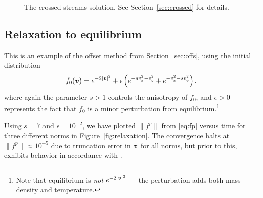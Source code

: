 \begin{figure}
    \centering
    \caption{The crossed streams solution. See Section~\vref{sec:crossed} for details.}
    \label{fig:hc1:sols}
\end{figure}

\subsection{Relaxation to equilibrium} \label{sec:relax}

This is an example of the offset method from Section~\ref{sec:offs}, using the initial distribution
\[
    f_0({\bm v}) = e^{-2|{\bm v}|^2} + \epsilon\left(e^{-sv_x^2-v_y^2} + 
            e^{-v_x^2-sv_y^2}\right),
\]
where again the parameter $s>1$ controls the anisotropy of $f_{0}$, and
$\epsilon>0$ represents the fact that $f_0$ is a minor perturbation from
equilibrium.\footnote{Note that equilibrium is {\em not} $e^{-2|{\bm v}|^2}$ ---
the perturbation adds both mass density and temperature.}

Using $s=7$ and $\epsilon=10^{-2}$, we have plotted $\|f^p\|$ from \eqref{eq:fp}
versus time for three different norms in Figure~\vref{fig:relaxation}. The
convergence halts at $\|f^p\|\approx10^{-5}$ due to truncation error in ${\bm v}$ for
all norms, but prior to this, exhibits behavior in accordance with
\cite{Gressman2011gcs}.

